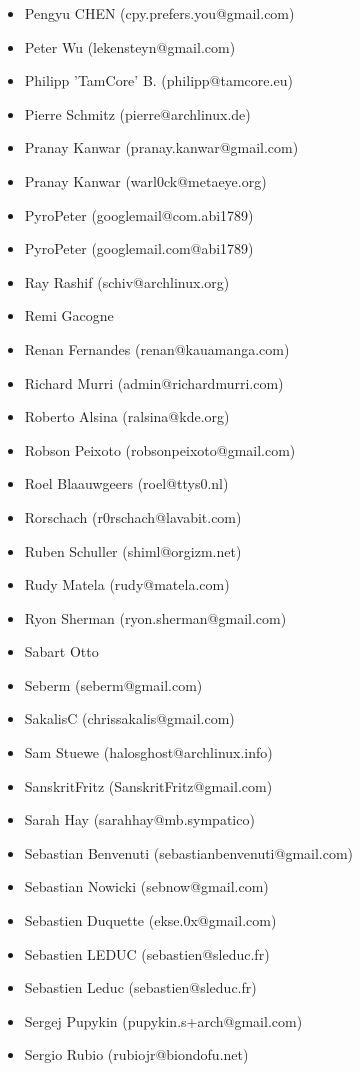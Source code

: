 \begin{itemize}
\item  Pengyu CHEN (cpy.prefers.you@gmail.com)
\item  Peter Wu (lekensteyn@gmail.com)
\item  Philipp 'TamCore' B. (philipp@tamcore.eu)
\item  Pierre Schmitz (pierre@archlinux.de)
\item  Pranay Kanwar (pranay.kanwar@gmail.com)
\item  Pranay Kanwar (warl0ck@metaeye.org)
\item  PyroPeter (googlemail@com.abi1789)
\item  PyroPeter (googlemail.com@abi1789)
\item  Ray Rashif (schiv@archlinux.org)
\item  Remi Gacogne
\item  Renan Fernandes (renan@kauamanga.com)
\item  Richard Murri (admin@richardmurri.com)
\item  Roberto Alsina (ralsina@kde.org)
\item  Robson Peixoto (robsonpeixoto@gmail.com)
\item  Roel Blaauwgeers (roel@ttys0.nl)
\item  Rorschach (r0rschach@lavabit.com)
\item  Ruben Schuller (shiml@orgizm.net)
\item  Rudy Matela (rudy@matela.com)
\item  Ryon Sherman (ryon.sherman@gmail.com)
\item  Sabart Otto \item  Seberm (seberm@gmail.com)
\item  SakalisC (chrissakalis@gmail.com)
\item  Sam Stuewe (halosghost@archlinux.info)
\item  SanskritFritz (SanskritFritz@gmail.com)
\item  Sarah Hay (sarahhay@mb.sympatico)
\item  Sebastian Benvenuti (sebastianbenvenuti@gmail.com)
\item  Sebastian Nowicki (sebnow@gmail.com)
\item  Sebastien Duquette (ekse.0x@gmail.com)
\item  Sebastien LEDUC (sebastien@sleduc.fr)
\item  Sebastien Leduc (sebastien@sleduc.fr)
\item  Sergej Pupykin (pupykin.s+arch@gmail.com)
\item  Sergio Rubio (rubiojr@biondofu.net)

\end{itemize}
